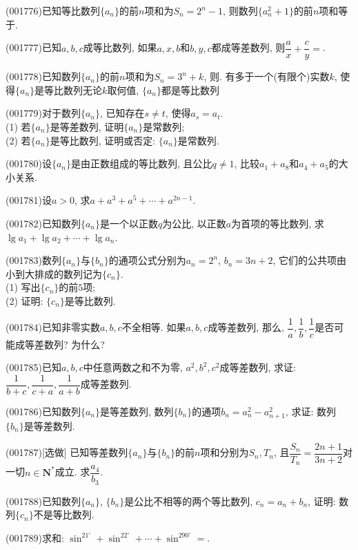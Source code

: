 \item (001776)已知等比数列$\{a_n\}$的前$n$项和为$S_n=2^n-1$, 则数列$\{a_n^2+1\}$的前$n$项和等于.
\item (001777)已知$a,b,c$成等比数列, 如果$a,x,b$和$b,y,c$都成等差数列, 则$\dfrac{a}{x}+\dfrac{c}{y}=$.
\item (001778)已知数列$\{a_n\}$的前$n$项和为$S_n=3^n+k$, 则.
{有多于一个(有限个)实数$k$, 使得$\{a_n\}$是等比数列}{无论$k$取何值, $\{a_n\}$都是等比数列}
\item (001779)对于数列$\{a_n\}$, 已知存在$s\ne t$, 使得$a_s=a_t$.\\ 
(1) 若$\{a_n\}$是等差数列, 证明$\{a_n\}$是常数列;\\ 
(2) 若$\{a_n\}$是等比数列, 证明或否定: $\{a_n\}$是常数列.
\item (001780)设$\{a_n\}$是由正数组成的等比数列, 且公比$q\ne 1$, 比较$a_1+a_8$和$a_4+a_5$的大小关系.
\item (001781)设$a>0$, 求$a+a^3+a^5+\cdots+a^{2n-1}$.
\item (001782)已知数列$\{a_n\}$是一个以正数$q$为公比, 以正数$a$为首项的等比数列,
求$\lg a_1+\lg a_2+\cdots+\lg a_n$.
\item (001783)数列$\{a_n\}$与$\{b_n\}$的通项公式分别为$a_n=2^n$, $b_n=3n+2$, 它们的公共项由小到大排成的数列记为$\{c_n\}$.\\ 
(1) 写出$\{c_n\}$的前$5$项;\\ 
(2) 证明: $\{c_n\}$是等比数列.
\item (001784)已知非零实数$a,b,c$不全相等. 如果$a,b,c$成等差数列, 那么, $\dfrac{1}{a},\dfrac{1}{b},\dfrac{1}{c}$是否可能成等差数列? 为什么?
\item (001785)已知$a,b,c$中任意两数之和不为零, $a^2,b^2,c^2$成等差数列, 求证: $\dfrac{1}{b+c},\dfrac{1}{c+a},\dfrac{1}{a+b}$成等差数列.
\item (001786)已知数列$\{a_n\}$是等差数列, 数列$\{b_n\}$的通项$b_n=a_n^2-a_{n+1}^2$, 求证: 数列$\{b_n\}$是等差数列.
\item (001787)[选做]
已知等差数列$\{a_n\}$与$\{b_n\}$的前$n$项和分别为$S_n,T_n$, 且$\dfrac{S_n}{T_n}=\dfrac{2n+1}{3n+2}$对一切$n\in \mathbf{N}^*$成立. 求$\dfrac{a_4}{b_3}$.
\item (001788)已知数列$\{a_n\}$, $\{b_n\}$是公比不相等的两个等比数列, $c_n=a_n+b_n$, 证明: 数列$\{c_n\}$不是等比数列.
\item (001789)求和: $\sin^21^\circ+\sin^22^\circ+\cdots+\sin^290^\circ=$.
